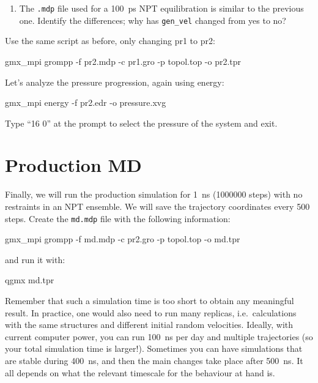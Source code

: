 \documentclass[10pt]{article}
\begin{document}
\begin{question}
    \begin{enumerate}[leftmargin=0.6cm]
        \renewcommand{\labelenumi}{Q\arabic{enumi}.}
        \setcounter{enumi}{8}
        \item The \texttt{.mdp} file used for a 100~ps NPT equilibration is similar to the previous one. Identify the differences; why has \texttt{gen\_vel} changed from yes to no?
    \end{enumerate}
\end{question}

Use the same script as before, only changing pr1 to pr2:

\begin{cmdline}
gmx_mpi grompp -f pr2.mdp -c pr1.gro -p topol.top -o pr2.tpr
\end{cmdline}

Let's analyze the pressure progression, again using energy:
\begin{cmdline}
gmx_mpi energy -f pr2.edr -o pressure.xvg
\end{cmdline}

Type ``16 0'' at the prompt to select the pressure of the system and exit. 


\section{Production MD}
Finally,  we will run the production simulation for 1~ns (1000000 steps) with no restraints in an NPT ensemble. We will save the trajectory coordinates every 500 steps. Create the \texttt{md.mdp} file with the following information:
 
\begin{cmdline}
gmx_mpi grompp -f md.mdp -c pr2.gro -p topol.top -o md.tpr
\end{cmdline}

and run it with:

\begin{cmdline}
qgmx md.tpr
\end{cmdline}

Remember that such a simulation time is too short to obtain any meaningful result. In practice, one would also need to run many replicas, i.e.\ calculations with the same structures and different initial random velocities. Ideally, with current computer power, you can run 100~ns per day and multiple trajectories (so your total simulation time is larger!). Sometimes you can have simulations that are stable during 400~ns, and then the main changes take place after 500~ns. It all depends on what the relevant timescale for the behaviour at hand is.
\end{document}
